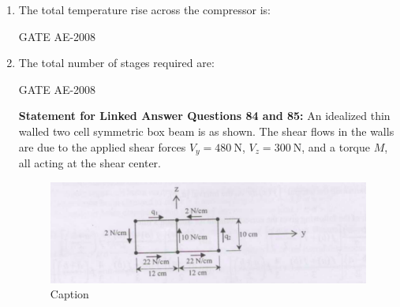 \documentclass[journal,12pt,onecolumn]{IEEEtran}
\theoremstyle{remark}
\begin{document}
\begin{enumerate}
\item The total temperature rise across the compressor is:  \\

\begin{enumerate}
\end{enumerate}
\hfill {GATE AE-2008} 

\quad

\item The total number of stages required are:  \\

\begin{enumerate}
\end{enumerate} 
\hfill {GATE AE-2008} 

\quad

\textbf{Statement for Linked Answer Questions 84 and 85:}  
An idealized thin walled two cell symmetric box beam is as shown.  
The shear flows in the walls are due to the applied shear forces $V_y = 480 \ \text{N}$, $V_z = 300 \ \text{N}$, and a torque $M$, all acting at the shear center.\\

\begin{figure}[H]
    \centering
    \includegraphics[width=0.5\linewidth]{figs/pic9.png}
    \caption{Caption}
    \label{fig:placeholder}
\end{figure}


\end{enumerate}
\end{document}
